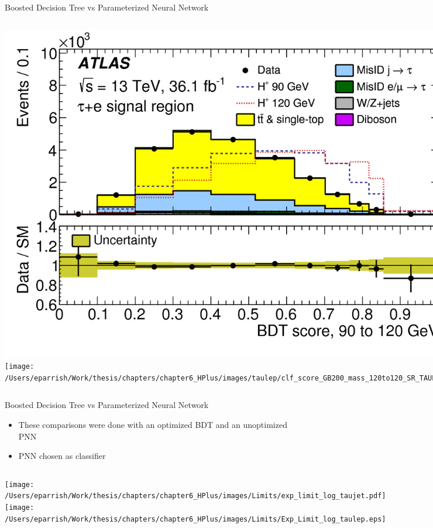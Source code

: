\documentclass[aspectratio=169,xcolor=table]{beamer}
\begin{document}
      \begin{frame}[c]{Boosted Decision Tree vs Parameterized Neural Network}
        \begin{columns}[c]
          \includegraphics[height=.6\textheight,keepaspectratio=true]{tauel_SR_2018/tauel_SR_90to120_2018.png}
          \texttt{[image: /Users/eparrish/Work/thesis/chapters/chapter6\_HPlus/images/taulep/clf\_score\_GB200\_mass\_120to120\_SR\_TAUEL.png]}
        \end{columns}
      \end{frame}

    \begin{frame}[t]{Boosted Decision Tree vs Parameterized Neural Network}
      \begin{itemize}
        \item These comparisons were done with an optimized BDT and an unoptimized PNN
        \item PNN chosen as classifier
      \end{itemize}
      \begin{columns}
      \centering
      \texttt{[image: /Users/eparrish/Work/thesis/chapters/chapter6\_HPlus/images/Limits/exp\_limit\_log\_taujet.pdf]}
      \centering
      \texttt{[image: /Users/eparrish/Work/thesis/chapters/chapter6\_HPlus/images/Limits/Exp\_Limit\_log\_taulep.eps]}
      \end{columns}
    \end{frame}
\end{document}
